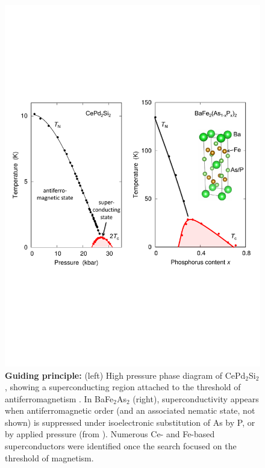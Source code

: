 \begin{figure}
\includegraphics[width=\columnwidth]{Figures/cpsbfaComparison.pdf}
\caption{{\bf Guiding principle:}  (left) High pressure phase diagram of CePd$_2$Si$_2$, showing a superconducting region attached to the 
threshold of antiferromagnetism \protect{}. 
In BaFe$_2$As$_2$ (right), 
superconductivity appears when antiferromagnetic order (and an associated nematic state, not shown) is suppressed 
under isoelectronic substitution of As by P, or by applied pressure (from \cite{hashimoto12}). Numerous Ce- and Fe-based superconductors were identified once the search focused on the threshold of magnetism.
}
\label{fig:Guiding}

\end{figure}



